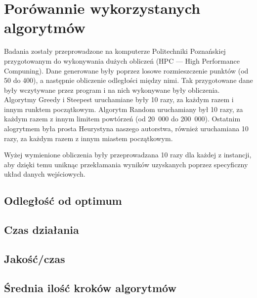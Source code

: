 \section{Porówannie wykorzystanych algorytmów}

Badania zostały przeprowadzone na komputerze Politechniki Poznańskiej przygotowanym do 
wykonywania dużych obliczeń (HPC --- High Performance Compuning). Dane generowane były 
poprzez losowe rozmieszczenie punktów (od 50 do 400), a następnie obliczenie odległości 
między nimi. Tak przygotowane dane były wczytywane przez program i na nich wykonywane były 
obliczenia. Algorytmy Greedy i Steepest uruchamiane były 10 razy, za każdym razem i innym 
runktem początkowym. Algorytm Random uruchamiany był 10 razy, za każdym razem z innym 
limitem powtórzeń (od 20~000 do 200~000). Ostatnim alogrytmem była prosta Heurystyna naszego
autorstwa, również uruchamiana 10 razy, za każdym razem z innym miastem początkowym.

Wyżej wymienione obliczenia były przeprowadzana 10 razy dla każdej z instancji, aby dzięki temu 
uniknąc przekłamania wyników uzyskanych poprzez specyficzny układ danych wejściowych.

\subsection{Odległość od optimum}

\subsection{Czas działania}

\subsection{Jakość/czas}

\subsection{Średnia ilość kroków algorytmów}